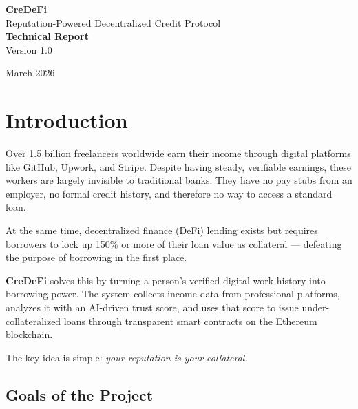 \documentclass[12pt, a4paper]{article}
\begin{document}
\begin{titlepage}
\centering
\vspace*{2cm}

{\Huge\bfseries CreDeFi}\\[0.5cm]
{\Large Reputation-Powered Decentralized Credit Protocol}\\[2cm]

{\large\textbf{Technical Report}}\\[0.5cm]
{\large Version 1.0}\\[2cm]

\vfill

{\large March 2026}\\[1cm]

\end{titlepage}

\tableofcontents
\newpage

\section{Introduction}

Over 1.5 billion freelancers worldwide earn their income through digital platforms like GitHub, Upwork, and Stripe. Despite having steady, verifiable earnings, these workers are largely invisible to traditional banks. They have no pay stubs from an employer, no formal credit history, and therefore no way to access a standard loan.

At the same time, decentralized finance (DeFi) lending exists but requires borrowers to lock up 150\% or more of their loan value as collateral --- defeating the purpose of borrowing in the first place.

\textbf{CreDeFi} solves this by turning a person's verified digital work history into borrowing power. The system collects income data from professional platforms, analyzes it with an AI-driven trust score, and uses that score to issue under-collateralized loans through transparent smart contracts on the Ethereum blockchain.

The key idea is simple: \textit{your reputation is your collateral.}

\subsection{Goals of the Project}
\end{document}
